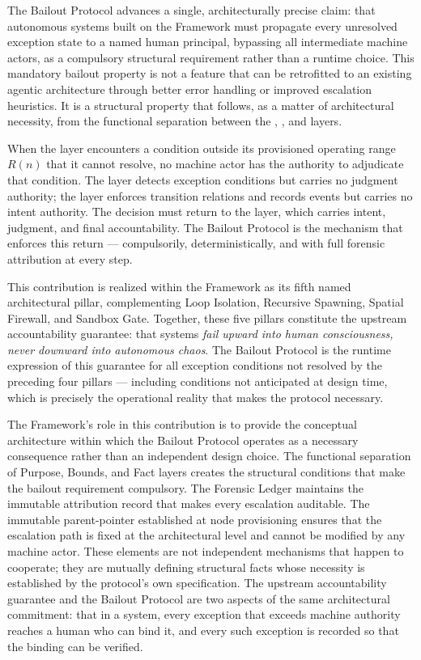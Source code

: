 The Bailout Protocol advances a single, architecturally precise claim: that autonomous systems built on the \bxthree{} Framework must propagate every unresolved exception state to a named human principal, bypassing all intermediate machine actors, as a compulsory structural requirement rather than a runtime choice. This mandatory bailout property is not a feature that can be retrofitted to an existing agentic architecture through better error handling or improved escalation heuristics. It is a structural property that follows, as a matter of architectural necessity, from the functional separation between the \purpose{}, \bounds{}, and \fact{} layers.

When the \bounds{} layer encounters a condition outside its provisioned operating range $R(n)$ that it cannot resolve, no machine actor has the authority to adjudicate that condition. The \bounds{} layer detects exception conditions but carries no judgment authority; the \fact{} layer enforces transition relations and records events but carries no intent authority. The decision must return to the \purpose{} layer, which carries intent, judgment, and final accountability. The Bailout Protocol is the mechanism that enforces this return --- compulsorily, deterministically, and with full forensic attribution at every step.

This contribution is realized within the \bxthree{} Framework as its fifth named architectural pillar, complementing Loop Isolation, Recursive Spawning, Spatial Firewall, and Sandbox Gate. Together, these five pillars constitute the upstream accountability guarantee: that \bxthree{} systems \emph{fail upward into human consciousness, never downward into autonomous chaos}. The Bailout Protocol is the runtime expression of this guarantee for all exception conditions not resolved by the preceding four pillars --- including conditions not anticipated at design time, which is precisely the operational reality that makes the protocol necessary.

The \bxthree{} Framework's role in this contribution is to provide the conceptual architecture within which the Bailout Protocol operates as a necessary consequence rather than an independent design choice. The functional separation of Purpose, Bounds, and Fact layers creates the structural conditions that make the bailout requirement compulsory. The Forensic Ledger maintains the immutable attribution record that makes every escalation auditable. The immutable parent-pointer established at node provisioning ensures that the escalation path is fixed at the architectural level and cannot be modified by any machine actor. These elements are not independent mechanisms that happen to cooperate; they are mutually defining structural facts whose necessity is established by the protocol's own specification. The upstream accountability guarantee and the Bailout Protocol are two aspects of the same architectural commitment: that in a \bxthree{} system, every exception that exceeds machine authority reaches a human who can bind it, and every such exception is recorded so that the binding can be verified.

